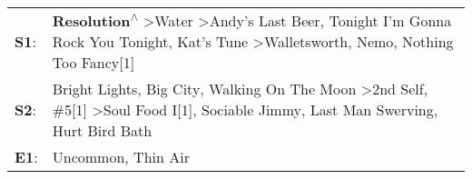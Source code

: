 \begin{supertabular}{p{0.03\textwidth}p{0.92\textwidth}}
 \textbf{S1}:  &  \textbf{Resolution\textsuperscript{$\wedge$}} \textgreater \enspace Water\textsuperscript{} \textgreater \enspace Andy's Last Beer\textsuperscript{}, \enspace Tonight I'm Gonna Rock You Tonight\textsuperscript{}, \enspace Kat's Tune\textsuperscript{} \textgreater \enspace Walletsworth\textsuperscript{}, \enspace Nemo\textsuperscript{}, \enspace Nothing Too Fancy[1]\textsuperscript{}  \enspace  \\
 \textbf{S2}:  &                           Bright Lights, Big City\textsuperscript{}, \enspace Walking On The Moon\textsuperscript{} \textgreater \enspace 2nd Self\textsuperscript{}, \enspace \#5[1]\textsuperscript{} \textgreater \enspace Soul Food I[1]\textsuperscript{}, \enspace Sociable Jimmy\textsuperscript{}, \enspace Last Man Swerving\textsuperscript{}, \enspace Hurt Bird Bath\textsuperscript{}  \enspace  \\
 \textbf{E1}:  &                                                                                                                                                                                                                                                                                                                                    Uncommon\textsuperscript{}, \enspace Thin Air\textsuperscript{}  \enspace  \\
\end{supertabular}
